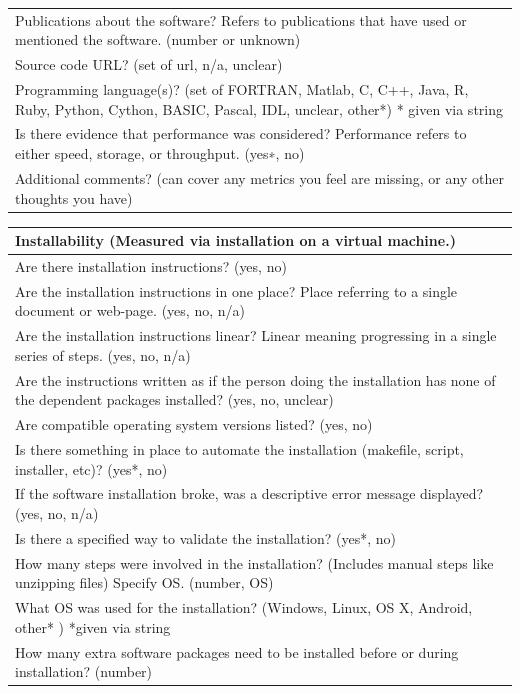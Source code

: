 \documentclass[12pt, notitlepage]{article}
\begin{document}
\begin{appendices}
\begin{singlespace}
\begin{tabular}{p{14cm}}
	Publications about the software? Refers to publications that have used or mentioned the software. (number or {unknown})\\
	Source code URL? ({set of url, n/a, unclear})\\
	Programming language(s)? (set of {FORTRAN, Matlab, C, C++, Java, R, Ruby, Python, Cython, BASIC, Pascal, IDL, unclear, other*}) * given via string \\
	Is there evidence that performance was considered? Performance refers to either speed, storage, or throughput. ({yes∗, no})\\
	Additional comments? (can cover any metrics you feel are missing, or any other thoughts you have) \\
	\hline
\end{tabular}

\def\arraystretch{1.5}
\begin{tabular}{p{14cm}}
	\hline		
	\textbf{Installability  (Measured via installation on a virtual machine.) }\\
	\hline
	Are there installation instructions? ({yes, no})\\
	Are the installation instructions in one place? Place referring to a single document or web-page. ({yes, no, n/a})\\
	Are the installation instructions linear? Linear meaning progressing  in a single series of steps. ({yes, no, n/a})\\
	Are the instructions written as if the person doing the installation has none of the dependent packages installed? ({yes, no, unclear})\\
	Are compatible operating system versions listed? ({yes, no})\\
	Is there something in place to automate the installation (makefile, script, installer, etc)? ({yes*, no})\\
	If the software installation broke, was a descriptive error message displayed? ({yes, no, n/a})\\
	Is there a specified way to validate the installation? ({yes*, no})\\
	How many steps were involved in the installation? (Includes manual steps like unzipping files) Specify OS. (number, OS)\\
	What OS was used for the installation? ({Windows, Linux, OS X, Android, other* }) *given via string\\
	How many extra software packages need to be installed before or during installation? (number)\\

\end{tabular}
\end{singlespace}
\end{appendices}
\end{document}
